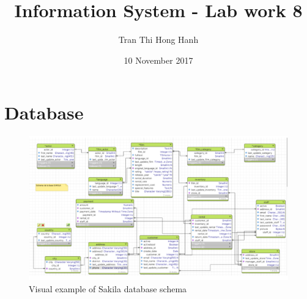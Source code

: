 \documentclass{article}
\title{Information System - Lab work 8}
\author{Tran Thi Hong Hanh}
\date{10 November 2017}
\begin{document}
\maketitle
\section*{Database}

\begin{figure}[h]
\includegraphics[scale = 0.6]{schema.PNG}
\caption{Visual example of Sakila database schema}
\end{figure}
\end{document}
